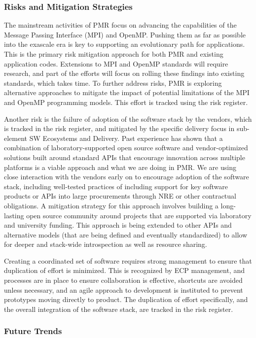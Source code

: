 \subsubsection{Risks and Mitigation Strategies}
The mainstream activities of PMR focus on advancing the capabilities of the Message Passing Interface (MPI) and OpenMP. Pushing them as far as possible into the exascale era is key to supporting an evolutionary path for applications. This is the primary risk mitigation approach for both PMR and existing application codes. Extensions to MPI and OpenMP standards will require research, and part of the efforts will focus on rolling these findings into existing standards, which takes time. To further address risks, PMR is exploring alternative approaches to mitigate the impact of potential limitations of the MPI and OpenMP programming models. This effort is tracked using the risk register.

Another risk is the failure of adoption of the software stack by the vendors, which is tracked in the risk register, and mitigated by the specific delivery focus in sub-element SW Ecosystems and Delivery. Past experience has shown that a combination of laboratory-supported open source software and vendor-optimized solutions built around standard APIs that encourage innovation across multiple platforms is a viable approach and what we are doing in PMR. We are using close interaction with the vendors early on to encourage adoption of the software stack, including well-tested practices of including support for key software products or APIs into large procurements through NRE or other contractual obligations. A mitigation strategy for this approach involves building a long-lasting open source community around projects that are supported via laboratory and university funding. This approach is being extended to other APIs and alternative models (that are being defined and eventually standardized) to allow for deeper and stack-wide introspection as well as resource sharing.

Creating a coordinated set of software requires strong management to ensure that duplication of effort is minimized. This is recognized by ECP management, and processes are in place to ensure collaboration is effective, shortcuts are avoided unless necessary, and an agile approach to development is instituted to prevent prototypes moving directly to product. The duplication of effort specifically, and the overall integration of the software stack, are tracked in the risk register. 

\subsubsection{Future Trends}
